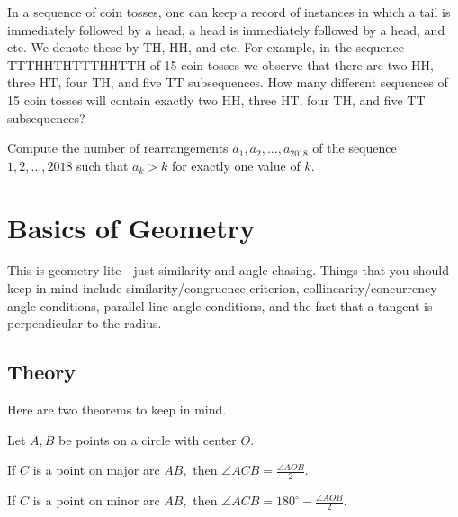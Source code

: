 \documentclass[blue,onecol]{shooting}
\begin{document}
     \begin{prob}[AIME 1986/13]{9}
In a sequence of coin tosses, one can keep a record of instances in which a tail is immediately followed by a head, a head is immediately followed by a head, and etc. We denote these by TH, HH, and etc. For example, in the sequence TTTHHTHTTTHHTTH of 15 coin tosses we observe that there are two HH, three HT, four TH, and five TT subsequences. How many different sequences of 15 coin tosses will contain exactly two HH, three HT, four TH, and five TT subsequences?
\end{prob}
    
     \begin{prob}[CMIMC 2018]{9}
Compute the number of rearrangements $a_1,a_2,\ldots,a_{2018}$ of the sequence $1,2,\ldots,2018$ such that $a_k>k$ for exactly one value of $k.$
\end{prob}


\chapter{Basics of Geometry}












This is geometry lite - just similarity and angle chasing. Things that you should keep in mind include similarity/congruence criterion, collinearity/concurrency angle conditions, parallel line angle conditions, and the fact that a tangent is perpendicular to the radius.

\section{Theory}
Here are two theorems to keep in mind.

\begin{theo}
Let $A,B$ be points on a circle with center $O.$

If $C$ is a point on major arc $AB,$ then $\angle ACB=\frac{\angle AOB}{2}.$

If $C$ is a point on minor arc $AB,$ then $\angle ACB=180^{\circ}-\frac{\angle AOB}{2}.$
\end{theo}
\end{document}
